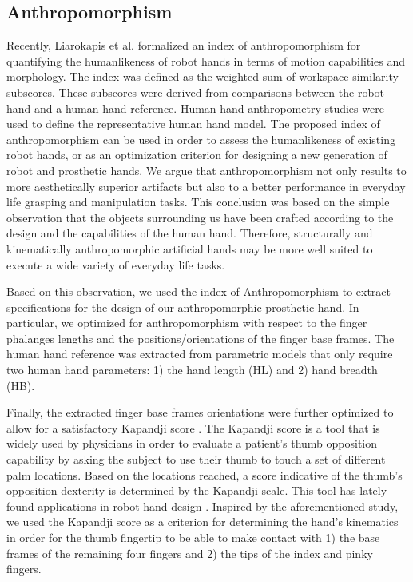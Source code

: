 \subsection{Anthropomorphism}

Recently, Liarokapis et al. \cite{Liarokapis2013ICRA} formalized an index of anthropomorphism for quantifying the humanlikeness of robot hands in terms of motion capabilities and morphology. The index was defined as the weighted sum of workspace similarity subscores. These subscores were derived from comparisons between the robot hand and a human hand reference. Human hand anthropometry studies \cite{BuchholzErgonomics1992} were used to define the representative human hand model. The proposed index of anthropomorphism can be used in order to assess the humanlikeness of existing robot hands, or as an optimization criterion for designing a new generation of robot and prosthetic hands. We argue that anthropomorphism not only results to more aesthetically superior artifacts but also to a better performance in everyday life grasping and manipulation tasks. This conclusion was based on the simple observation that the objects surrounding us have been crafted according to the design and the capabilities of the human hand. Therefore, structurally and kinematically anthropomorphic artificial hands may be more well suited to execute a wide variety of everyday life tasks. 

Based on this observation, we used the index of Anthropomorphism to extract specifications for the design of our anthropomorphic prosthetic hand. In particular, we optimized for anthropomorphism with respect to the finger phalanges lengths and the positions/orientations of the finger base frames. The human hand reference was extracted from parametric models \cite{BuchholzErgonomics1992} that only require two human hand parameters: 1) the hand length (HL) and 2) hand breadth (HB). 

Finally, the extracted finger base frames orientations were further optimized to allow for a satisfactory Kapandji score \cite{Kapandji}. The Kapandji score is a tool that is widely used by physicians in order to evaluate a patient's thumb opposition capability by asking the subject to use their thumb to touch a set of different palm locations. Based on the locations reached, a score indicative of the thumb's opposition dexterity is determined by the Kapandji scale. This tool has lately found applications in robot hand design \cite{GrebensteinThesis}. Inspired by the aforementioned study, we used the Kapandji score as a criterion for determining the hand's kinematics in order for the thumb fingertip to be able to make contact with 1) the base frames of the remaining four fingers and 2) the tips of the index and pinky fingers. 

